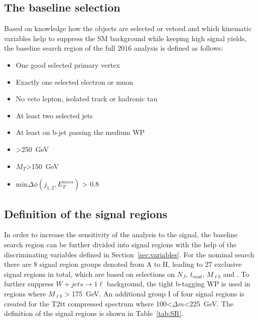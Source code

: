 



\subsection{The baseline selection~\label{sec:baseline}}

Based on knowledge how the objects are selected or vetoed and  which kinematic variables help to suppress the SM background while keeping high signal yields, the baseline search region of the full 2016 analysis is defined as follows:

\begin{itemize}
\item One good selected primary vertex
\item Exactly one selected electron or muon
\item No veto lepton, isolated track or hadronic tau
\item At least two selected jets
\item At least on b-jet passing the medium WP 
\item \MET>250~GeV
\item $M_{T}$>150~GeV
\item min$\Delta \phi (j_{1,2}, E_{T}^{miss})$ > 0.8
\end{itemize}


\subsection{Definition of the signal regions~\label{sec:sr}}

In order to increase the sensitivity of the analysis to the signal, the baseline search region can be further divided into signal regions with the help of the discriminating variables defined in Section~\ref{sec:variables}. For the nominal search there are 8 signal region groups denoted from A to H, leading to 27 exclusive signal regions in total, which are based on selections on $N_{J}$, $t_{mod}$, $M_{\ell b}$ and \MET. To further suppress $W+jets \to 1\ell$ background, the tight b-tagging WP is used in regions where $M_{\ell b}>$175~GeV.  An additional group I of four signal regions is created for the T2tt compressed spectrum where 100<$\Delta m$<225~GeV. The definition of the signal regions is shown in Table~\ref{tab:SR}.


